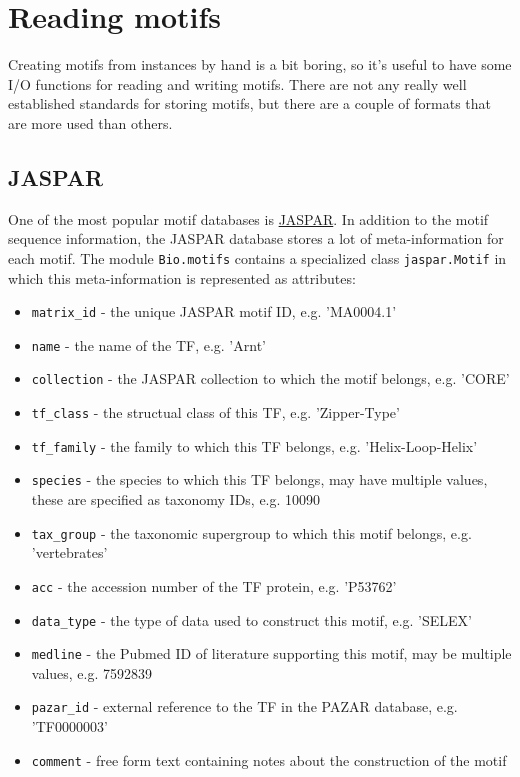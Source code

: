 \section{Reading motifs}
\label{sec:io}

Creating motifs from instances by hand is a bit boring, so it's
useful to have some I/O functions for reading and writing
motifs. There are not any really well established standards for storing
motifs, but there are a couple of formats that are more used than
others.

\subsection{JASPAR}
One of the most popular motif databases is \href{http://jaspar.genereg.net}{JASPAR}. In addition to the motif sequence information, the JASPAR database stores a lot of meta-information for each motif. The module \verb+Bio.motifs+ contains a specialized class \verb+jaspar.Motif+ in which this meta-information is represented as attributes:
\begin{itemize}
    \item \verb+matrix_id+ - the unique JASPAR motif ID, e.g. 'MA0004.1'
    \item \verb+name+ - the name of the TF, e.g. 'Arnt'
    \item \verb+collection+ - the JASPAR collection to which the motif belongs, e.g. 'CORE'
    \item \verb+tf_class+ - the structual class of this TF, e.g. 'Zipper-Type'
    \item \verb+tf_family+ - the family to which this TF belongs, e.g. 'Helix-Loop-Helix'
    \item \verb+species+ - the species to which this TF belongs, may have multiple values, these are specified as taxonomy IDs, e.g. 10090
    \item \verb+tax_group+ - the taxonomic supergroup to which this motif belongs, e.g. 'vertebrates'
    \item \verb+acc+ - the accession number of the TF protein, e.g. 'P53762'
    \item \verb+data_type+ - the type of data used to construct this motif, e.g. 'SELEX'
    \item \verb+medline+ - the Pubmed ID of literature supporting this motif, may be multiple values, e.g. 7592839
    \item \verb+pazar_id+ - external reference to the TF in the PAZAR database, e.g. 'TF0000003'
    \item \verb+comment+ - free form text containing notes about the construction of the motif
\end{itemize}

